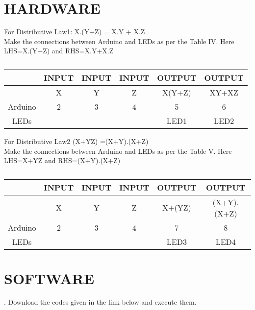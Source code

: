 \documentclass[conference]{IEEEtran}
\begin{document}
\section{HARDWARE}
\begin{flushleft}
For Distributive Law1: X.(Y+Z) = X.Y + X.Z \\
Make the connections between Arduino and LEDs as per the Table IV. Here LHS=X.(Y+Z) and RHS=X.Y+X.Z\\

\begin{table}[h]
\begin{tabular}{|c | c | c | c | c | c |} \hline
 & \textbf{INPUT} & \textbf{INPUT} & \textbf{INPUT} & \textbf{OUTPUT} & \textbf{OUTPUT} \\\hline
 & X & Y & Z & X(Y+Z) & XY+XZ \\ \hline
Arduino & 2 & 3 & 4 & 5 & 6 \\ \hline
LEDs &  &  &  & LED1 & LED2 \\ \hline
\end{tabular}
\caption{\label{tab:widgets}}
\end{table}
\end{flushleft}
\begin{flushleft}
For Distributive Law2 (X+YZ) =(X+Y).(X+Z) \\
Make the connections between Arduino and LEDs as per the Table V. Here LHS=X+YZ and RHS=(X+Y).(X+Z) \\
\end{flushleft}
\begin{table}[h]
\begin{tabular}{|c | c | c | c | c | c |} \hline
 & \textbf{INPUT} & \textbf{INPUT} & \textbf{INPUT} & \textbf{OUTPUT} & \textbf{OUTPUT} \\\hline
 & X & Y & Z & X+(YZ) & (X+Y).(X+Z) \\ \hline
Arduino & 2 & 3 & 4 & 7 & 8 \\ \hline
LEDs &  &  &  & LED3 & LED4 \\ \hline
\end{tabular}
\caption{\label{tab:widgets}}
\end{table}

\section{SOFTWARE}
. Download the codes given in the link below and execute them.\\
\end{document}
